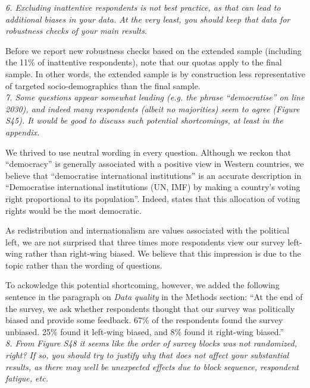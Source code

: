 \documentclass[12pt,english]{article}
\begin{document}
\textit{6. Excluding inattentive respondents is not best practice, as that can lead to additional biases in your data. At the very least, you should keep that data for robustness checks of your main results.}

Before we report new robustness checks based on the extended sample (including the 11\% of inattentive respondents), note that our quotas apply to the final sample. In other words, the extended sample is by construction less representative of targeted socio-demographics than the final sample.
~\\

\textit{7. Some questions appear somewhat leading (e.g. the phrase “democratise” on line 2030), and indeed many respondents (albeit no majorities) seem to agree (Figure S45). It would be good to discuss such potential shortcomings, at least in the appendix.}

We thrived to use neutral wording in every question. Although we reckon that ``democracy'' is generally associated with a positive view in Western countries, we believe that ``democratise international institutions'' is an accurate description in ``Democratise international institutions (UN, IMF) by making a country's voting right proportional to its population''. Indeed, \citet{woodward_imf_2007} states that this allocation of voting rights would be the most democratic.

As redistribution and internationalism are values associated with the political left, we are not surprised that three times more respondents view our survey left-wing rather than right-wing biased. We believe that this impression is due to the topic rather than the wording of questions. 

To ackowledge this potential shortcoming, however, we added the following sentence in the paragraph on \textit{Data quality} in the Methods section: ``At the end of the survey, we ask whether respondents thought that our survey was politically biased and provide some feedback. 67\% of the respondents found the survey unbiased. 25\% found it left-wing biased, and 8\% found it right-wing biased.''
~\\

\textit{8. From Figure S48 it seems like the order of survey blocks was not randomized, right? If so, you should try to justify why that does not affect your substantial results, as there may well be unexpected effects due to block sequence, respondent fatigue, etc.}

~\\
\end{document}
